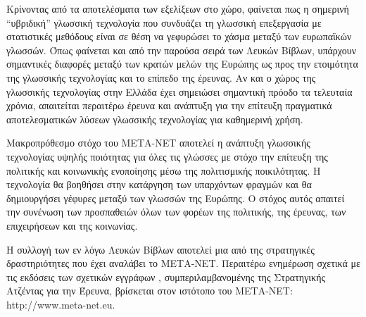 \documentclass[]{../../metanetpaper}
\begin{document}
\begin{multicols}{2}

Κρίνοντας από τα αποτελέσματα των εξελίξεων στο χώρο, φαίνεται πως η σημερινή ``υβριδική'' γλωσσική τεχνολογία που συνδυάζει τη γλωσσική επεξεργασία με στατιστικές μεθόδους είναι σε θέση να γεφυρώσει το χάσμα μεταξύ των ευρωπαϊκών γλωσσών. Όπως φαίνεται και από την παρούσα σειρά των Λευκών Βίβλων, υπάρχουν σημαντικές διαφορές μεταξύ των κρατών μελών της Ευρώπης ως προς την ετοιμότητα της γλωσσικής τεχνολογίας και το επίπεδο της έρευνας. Αν και ο χώρος της γλωσσικής τεχνολογίας στην Ελλάδα έχει σημειώσει σημαντική πρόοδο τα τελευταία χρόνια, απαιτείται περαιτέρω έρευνα και ανάπτυξη για την επίτευξη πραγματικά αποτελεσματικών λύσεων γλωσσικής τεχνολογίας για καθημερινή χρήση. 

Μακροπρόθεσμο στόχο του ΜΕΤΑ-ΝΕΤ αποτελεί η ανάπτυξη γλωσσικής τεχνολογίας υψηλής ποιότητας για όλες τις γλώσσες με στόχο την επίτευξη της πολιτικής και κοινωνικής ενοποίησης μέσω της πολιτισμικής ποικιλότητας. Η τεχνολογία θα βοηθήσει στην κατάργηση των υπαρχόντων φραγμών και θα δημιουργήσει γέφυρες μεταξύ των γλωσσών της Ευρώπης. Ο στόχος αυτός απαιτεί  την συνένωση των προσπαθειών όλων των φορέων της πολιτικής, της έρευνας, των επιχειρήσεων και της κοινωνίας.

Η συλλογή των εν λόγω Λευκών Βίβλων αποτελεί μια από της στρατηγικές δραστηριότητες που έχει αναλάβει το ΜΕΤΑ-ΝΕΤ. Περαιτέρω ενημέρωση σχετικά με τις εκδόσεις των σχετικών εγγράφων \cite{Meta1},  συμπεριλαμβανομένης της Στρατηγικής Ατζέντας για την Έρευνα, βρίσκεται στον ιστότοπο του ΜΕΤΑ-ΝΕΤ: http://www.meta-net.eu.
\end{multicols}

\clearpage


\end{document}
